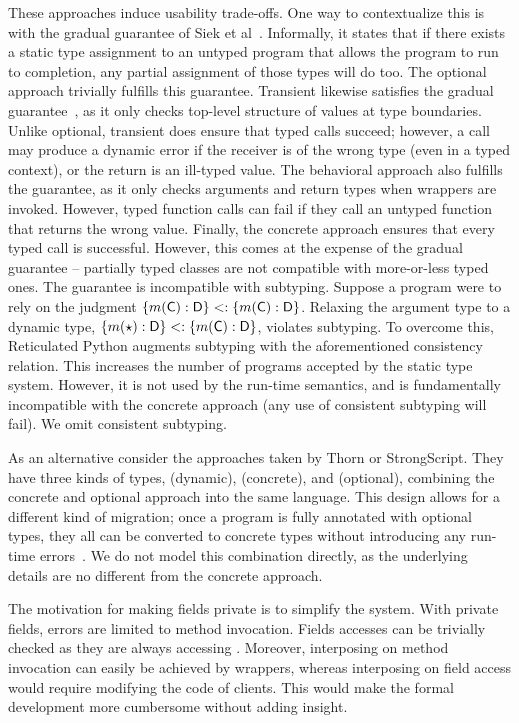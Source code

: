 \documentclass[USenglish]{tex/lipics-v2016}
\begin{document}
These approaches induce usability trade-offs. One way to contextualize this
is with the gradual guarantee of Siek et
al~\cite{GradualGuarantee}. Informally, it states that if there exists a
static type assignment to an untyped program that allows the program to run
to completion, any partial assignment of those types will do too. The
optional approach trivially fulfills this guarantee.  Transient likewise
satisfies the gradual guarantee~\cite{Vitousek2017}, as it only checks
top-level structure of values at type boundaries. Unlike optional, transient
does ensure that typed calls succeed; however, a call may produce a dynamic
error if the receiver is of the wrong type (even in a typed context), or the
return is an ill-typed value.  The behavioral approach also fulfills the
guarantee, as it only checks arguments and return types when wrappers are
invoked. However, typed function calls can fail if they call an untyped
function that returns the wrong value. Finally, the concrete approach
ensures that every typed call is successful. However, this comes at the
expense of the gradual guarantee -- partially typed classes are not
compatible with more-or-less typed ones.  The guarantee
is incompatible with subtyping. Suppose a program were to rely on the
judgment $\{m(\C):\D\} <: \{m(\C):\D\}$.  Relaxing the argument type to a
dynamic type, $\{m(\any):\D\} <: \{m(\C):\D\}$, violates subtyping.  To
overcome this, Reticulated Python augments subtyping with the aforementioned
consistency relation. This increases the number of programs accepted by the
static type system. However, it is not used by the run-time semantics, and
is fundamentally incompatible with the concrete approach (any use of
consistent subtyping will fail).  We omit consistent subtyping.

As an alternative consider the approaches taken by Thorn or
StrongScript. They have three kinds of types, \any (dynamic), \C (concrete),
and  \C (optional), combining the concrete and optional approach
into the same language. This design allows for a different kind of
migration; once a program is fully annotated with optional types, they all
can be converted to concrete types without introducing any run-time
errors~\cite{ecoop15}.  We do not model this combination directly, as the
underlying details are no different from the concrete approach.

The motivation for making fields private is to simplify the system. With
private fields, errors are limited to method invocation. Fields accesses can
be trivially checked as they are always accessing \this. Moreover, interposing on
method invocation can easily be achieved by wrappers, whereas interposing
on field access would require modifying the code of clients. This would make
the formal development more cumbersome without adding insight.
\end{document}
